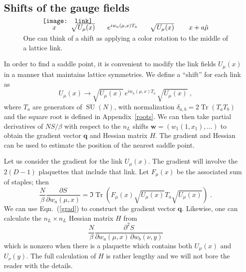 \documentclass[preprint,aps,prd]{revtex4-2}
\newcommand{\be}{\begin{equation}}
\newcommand{\eq}{\end{equation}}
\DeclareMathOperator{\SU}{SU}
\DeclareMathOperator{\Tr}{Tr}
\begin{document}
\subsection{Shifts of the gauge fields}

\begin{figure}
  \[
  \begin{array}{l}
    \mbox{} \hspace{0.2in} x \hspace{0.3in} \sqrt{U_\mu(x)}
    \hspace{0.25in} e^{i w_{a}(\mu, x) T_a}
    \hspace{0.25in} \sqrt{U_\mu(x)} \hspace{0.3in} x+a\hat{\mu} \\[-0.3in]
  \texttt{[image: link]}
  \end{array}
  \]
  \caption{One can think of a shift as applying a color rotation
    to the middle of a lattice link. \label{shift}}
\end{figure}

In order to find a saddle point, it is convenient to modify
the link fields $U_\mu(x)$ in a manner that maintains lattice symmetries.
We define a ``shift'' for each link as
\be
  U_\mu(x) \to \sqrt{U_\mu(x)}\, e^{i w_{a}(\mu, x) T_a}\, \sqrt{U_\mu(x)} \; ,
    \label{shifts}
\eq
where $T_a$ are generators of $\SU(N)$, with normalization
$\delta_{a,b} = 2 \Tr(T_a T_b)$ and the square root is defined
in Appendix~\ref{roots}.
We can then take partial derivatives of $N S/\beta$ with
respect to the $n_L$ shifts $\mathbf{w} = \left(w_1(1, x_1), \ldots\right)$
to obtain the gradient vector $\mathbf{q}$ and Hessian matrix
$H$.  The gradient and Hessian can be used to estimate the
position of the nearest saddle point.

Let us consider the gradient for the link $U_\mu(x)$.
The gradient will involve the $2 (D-1)$ plaquettes that include that link.
Let $F_\mu(x)$ be the associated sum of staples; then
\be
   \frac{N}{\beta} \frac{\partial S}{\partial w_a(\mu, x)} =
   \Im\Tr\left(F_\mu(x) \sqrt{U_\mu(x)} T_a \sqrt{U_\mu(x)}\right) \; .
   \label{grad}
\eq
We can use Eqn.~(\ref{grad}) to construct the gradient vector $\mathbf{q}$.
Likewise, one can calculate the $n_L\times n_L$ Hessian matrix
$H$ from
\be
      \frac{N}{\beta} \frac{\partial^2 S}{\partial w_a(\mu, x)\, \partial w_b(\nu, y)}
\eq
which is nonzero when there is a plaquette which contains both
$U_\mu(x)$ and $U_\nu(y)$.
The full calculation of $H$ is rather lengthy and we will not bore the reader
with the details.
\end{document}
